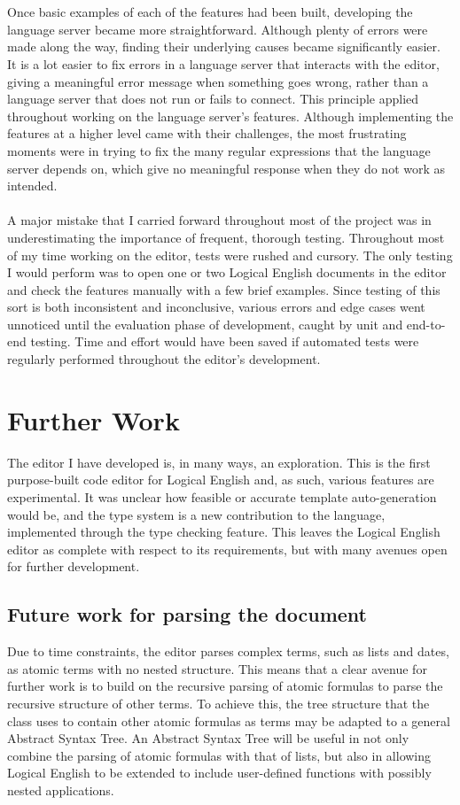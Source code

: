 \documentclass[../main.tex]{subfiles}
\begin{document}
\\
\\
Once basic examples of each of the features had been built, developing the language server became more straightforward. Although plenty of errors were made along the way, finding their underlying causes became significantly easier. It is a lot easier to fix errors in a language server that interacts with the editor, giving a meaningful error message when something goes wrong, rather than a language server that does not run or fails to connect. This principle applied throughout working on the language server's features. Although implementing the features at a higher level came with their challenges, the most frustrating moments were in trying to fix the many regular expressions that the language server depends on, which give no meaningful response when they do not work as intended.
\\
\\
A major mistake that I carried forward throughout most of the project was in underestimating the importance of frequent, thorough testing. Throughout most of my time working on the editor, tests were rushed and cursory. The only testing I would perform was to open one or two Logical English documents in the editor and check the features manually with a few brief examples. Since testing of this sort is both inconsistent and inconclusive, various errors and edge cases went unnoticed until the evaluation phase of development, caught by unit and end-to-end testing. Time and effort would have been saved if automated tests were regularly performed throughout the editor's development.

\section{Further Work}
The editor I have developed is, in many ways, an exploration. This is the first purpose-built code editor for Logical English and, as such, various features are experimental. It was unclear how feasible or accurate template auto-generation would be, and the type system is a new contribution to the language, implemented through the type checking feature. This leaves the Logical English editor as complete with respect to its requirements, but with many avenues open for further development.

\subsection{Future work for parsing the document}
Due to time constraints, the editor parses complex terms, such as lists and dates, as atomic terms with no nested structure. This means that a clear avenue for further work is to build on the recursive parsing of atomic formulas to parse the recursive structure of other terms. To achieve this, the tree structure that the  class uses to contain other atomic formulas as terms may be adapted to a general Abstract Syntax Tree. An Abstract Syntax Tree will be useful in not only combine the parsing of atomic formulas with that of lists, but also in allowing Logical English to be extended to include user-defined functions with possibly nested applications.
\end{document}
